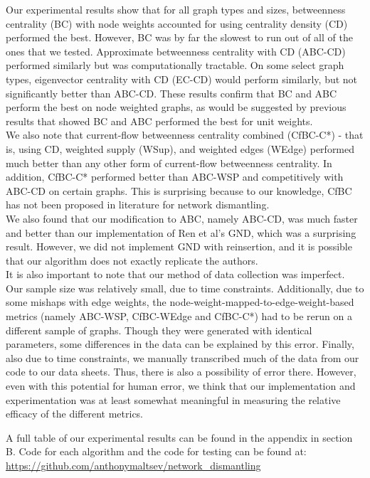 \documentclass{article}
\begin{document}
Our experimental results show that for all graph types and sizes, betweenness centrality (BC) with node weights accounted for using centrality density (CD) performed the best. However, BC was by far the slowest to run out of all of the ones that we tested. Approximate betweenness centrality with CD (ABC-CD) performed similarly but was computationally tractable. On some select graph types, eigenvector centrality with CD (EC-CD) would perform similarly, but not significantly better than ABC-CD. These results confirm that BC and ABC perform the best on node weighted graphs, as would be suggested by previous results that showed BC and ABC performed the best for unit weights. \\

We also note that current-flow betweenness centrality combined (CfBC-C*) - that is, using CD, weighted supply (WSup), and weighted edges (WEdge) performed much better than any other form of current-flow betweenness centrality. In addition, CfBC-C* performed better than ABC-WSP and competitively with ABC-CD on certain graphs. This is surprising because to our knowledge, CfBC has not been proposed in literature for network dismantling. \\

We also found that our modification to ABC, namely ABC-CD, was much faster and better than our implementation of Ren et al's GND, which was a surprising result. However, we did not implement GND with reinsertion, and it is possible that our algorithm does not exactly replicate the authors. \\

It is also important to note that our method of data collection was imperfect. Our sample size was relatively small, due to time constraints. Additionally, due to some mishaps with edge weights, the node-weight-mapped-to-edge-weight-based metrics (namely ABC-WSP, CfBC-WEdge and CfBC-C*) had to be rerun on a different sample of graphs. Though they were generated with identical parameters, some differences in the data can be explained by this error.
Finally, also due to time constraints, we manually transcribed much of the data from our code to our data sheets. Thus, there is also a possibility of error there. However, even with this potential for human error, we think that our implementation and experimentation was at least somewhat meaningful in measuring the relative efficacy of the different metrics.

A full table of our experimental results can be found in the appendix in section B. Code for each algorithm and the code for testing can be found at: \url{https://github.com/anthonymaltsev/network_dismantling}
\end{document}
